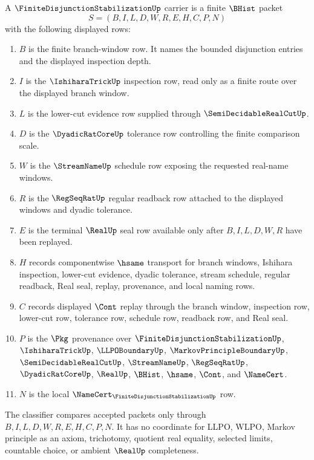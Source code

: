 \begin{definition}
\label{def:finite-disjunction-stabilization-carrier}
A $\FiniteDisjunctionStabilizationUp$ carrier is a finite $\BHist$ packet
$$
S=(B,I,L,D,W,R,E,H,C,P,N)
$$
with the following displayed rows:
\begin{enumerate}
\item $B$ is the finite branch-window row. It names the bounded disjunction entries and the displayed inspection depth.
\item $I$ is the $\IshiharaTrickUp$ inspection row, read only as a finite route over the displayed branch window.
\item $L$ is the lower-cut evidence row supplied through $\SemiDecidableRealCutUp$.
\item $D$ is the $\DyadicRatCoreUp$ tolerance row controlling the finite comparison scale.
\item $W$ is the $\StreamNameUp$ schedule row exposing the requested real-name windows.
\item $R$ is the $\RegSeqRatUp$ regular readback row attached to the displayed windows and dyadic tolerance.
\item $E$ is the terminal $\RealUp$ seal row available only after $B,I,L,D,W,R$ have been replayed.
\item $H$ records componentwise $\hsame$ transport for branch windows, Ishihara inspection, lower-cut evidence, dyadic tolerance, stream schedule, regular readback, Real seal, replay, provenance, and local naming rows.
\item $C$ records displayed $\Cont$ replay through the branch window, inspection row, lower-cut row, tolerance row, schedule row, readback row, and Real seal.
\item $P$ is the $\Pkg$ provenance over $\FiniteDisjunctionStabilizationUp$, $\IshiharaTrickUp$, $\LLPOBoundaryUp$, $\MarkovPrincipleBoundaryUp$, $\SemiDecidableRealCutUp$, $\StreamNameUp$, $\RegSeqRatUp$, $\DyadicRatCoreUp$, $\RealUp$, $\BHist$, $\hsame$, $\Cont$, and $\NameCert$.
\item $N$ is the local $\NameCert_{\FiniteDisjunctionStabilizationUp}$ row.
\end{enumerate}
The classifier compares accepted packets only through $B,I,L,D,W,R,E,H,C,P,N$. It has no coordinate for LLPO, WLPO, Markov principle as an axiom, trichotomy, quotient real equality, selected limits, countable choice, or ambient $\RealUp$ completeness.
\end{definition}


